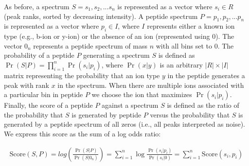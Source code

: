 \documentclass[arial,11pt]{article}
\begin{document}
As before, a spectrum $S = s_{1}, s_{2}, ... s_{n}$  is represented as a vector where $s_{i} \in R$ (peak ranks, sorted by decreasing intensity). A peptide spectrum
$P = p_{1}, p_{2}, ... p_{n}$ is represented as a vector where $p_{i} \in I$, where $I$ represents either a known ion type (e.g., b-ion or y-ion) or the absence of an ion (represented using $0$). The vector  $0_n$  represents a peptide spectrum of mass $n$ with all bins set to $0$. The probability of a peptide $P$ generating a spectrum $S$ is defined as $\Pr(S|P) = \prod_{i=1}^{n}\Pr(s_{i}|p_{i})$, where $\Pr(x|y)$ is an arbitrary $\left|R\right| \times \left|I\right|$ matrix representing the probability that an ion type $y$ in the peptide generates a peak with rank $x$ in the spectrum. When there are multiple ions associated with a particular bin in peptide $P$ we choose the ion that maximizes $\Pr(s_{i}|p_{i})$. Finally, the score of a peptide $P$ against a spectrum $S$ is defined as the ratio of the probability that $S$ is generated by peptide $P$ versus the probability that $S$ is generated by a peptide spectrum of all zeros (i.e., all peaks interpreted as noise).  We express this score as the sum of a log odds ratio:

\begin{eqnarray}
	\text{Score}(S,P) = log\left(\frac{\Pr(S|P)}{\Pr(S|0_n)}\right) =
	\sum_{i=1}^{n}\log \frac{\Pr(s_{i}|p_{i})}{\Pr(s_{i}|0)} =
	\sum_{i=1}^{n}{\text{Score}(s_{i}, p_{i})}
\label{eqPSMlikelihood}
\end{eqnarray}
\end{document}
